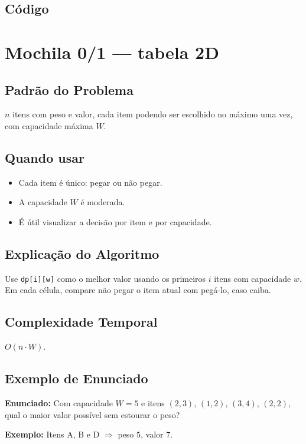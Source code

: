 \subsection{Código}

\section{Mochila 0/1 --- tabela 2D}

\subsection{Padrão do Problema}
$n$ itens com peso e valor, cada item podendo ser escolhido no máximo uma vez, com capacidade máxima $W$.

\subsection{Quando usar}
\begin{itemize}[nosep]
  \item Cada item é único: pegar ou não pegar.
  \item A capacidade $W$ é moderada.
  \item É útil visualizar a decisão por item e por capacidade.
\end{itemize}

\subsection{Explicação do Algoritmo}
Use \texttt{dp[i][w]} como o melhor valor usando os primeiros $i$ itens com capacidade $w$. Em cada célula, compare não pegar o item atual com pegá-lo, caso caiba.

\subsection{Complexidade Temporal}
$O(n \cdot W)$.

\subsection{Exemplo de Enunciado}
\begin{exemplodiabox}
\textbf{Enunciado:} Com capacidade $W = 5$ e itens $(2,3)$, $(1,2)$, $(3,4)$, $(2,2)$, qual o maior valor possível sem estourar o peso?

\textbf{Exemplo:} Itens A, B e D $\Rightarrow$ peso $5$, valor $7$.
\end{exemplodiabox}

